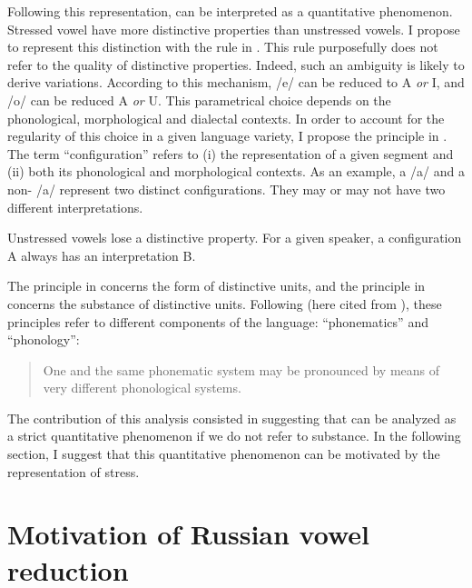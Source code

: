 \documentclass[output=paper,modfonts,newtxmath,hidelinks,]{langscibook}
\begin{document}
\noindent Following this representation,   can be interpreted as a quantitative phenomenon. Stressed vowel have more distinctive properties than unstressed vowels. I propose to represent this distinction with the rule in . This rule purposefully does not refer to the quality of distinctive properties. Indeed, such an ambiguity is likely to derive variations. According to this mechanism, /e/ can be reduced to {\textbar}A{\textbar} \textit{or} {\textbar}I{\textbar}, and /o/ can be reduced {\textbar}A{\textbar} \textit{or} {\textbar}U{\textbar}. This parametrical choice depends on the phonological, morphological and dialectal contexts. In order to account for the regularity of this choice in a given language variety, I propose the principle in . The term “configuration” refers to (i) the representation of a given segment and (ii) both its phonological and morphological contexts. As an example, a  /a/ and a non- /a/ represent two distinct configurations. They may or may not have two different interpretations.

\label{5:21}
\ea Unstressed vowels lose a distinctive property.\label{5:21a}
\ex For a given speaker, a configuration A always has an interpretation B.\label{5:21b}
\z\z

\noindent The principle in  concerns the form of distinctive units, and the principle in  concerns the substance of distinctive units. Following \citet{Hjelmslev1936} (here cited from \citealt{Hjelmslev1973}), these principles refer to different components of the language: “phonematics” and “phonology”:

\begin{quotation}
One and the same phonematic system may be pronounced by means of very different phonological systems. \citep[159]{Hjelmslev1973}
\end{quotation}

The contribution of this analysis consisted in suggesting that   can be analyzed as a strict quantitative phenomenon if we do not refer to substance. In the following section, I suggest that this quantitative phenomenon can be motivated by the representation of stress.

\section{Motivation of Russian vowel reduction}\label{5:s4}
\end{document}
